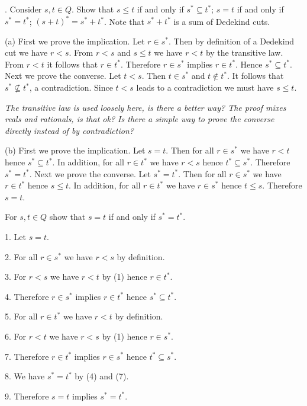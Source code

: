 \nopagenumbers

. Consider $s,t\in Q$. Show that
\medskip
{} $s\le t$ if and only if $s^*\subseteq t^*$;
 $s=t$ if and only if $s^*=t^*$;
 $(s+t)^*=s^*+t^*$. Note that $s^*+t^*$ is a sum of Dedekind
cuts.

\bigskip
\noindent
(a)
First we prove the implication.
Let $r\in s^*$. Then by definition of a Dedekind cut we have $r<s$.
From $r<s$ and $s\le t$ we have $r<t$ by the transitive law.
From $r<t$ it follows that $r\in t^*$.
Therefore $r\in s^*$ implies $r\in t^*$. Hence $s^*\subseteq t^*$.
Next we prove the converse.
Let $t<s$. Then $t\in s^*$ and $t\not\in t^*$.
It follows that $s^*\not\subseteq t^*$, a contradiction.
Since $t<s$ leads to a contradiction we must have $s\le t$.

\bigskip
\noindent
{\it The transitive law is used loosely here, is there a better way?
The proof mixes reals and rationals, is that ok?
Is there a simple way to prove the converse directly instead of by
contradiction?}

\bigskip
\noindent
(b)
First we prove the implication.
Let $s=t$.
Then for all $r\in s^*$ we have $r<t$ hence $s^*\subseteq t^*$.
In addition, for all $r\in t^*$ we have $r<s$ hence $t^*\subseteq s^*$.
Therefore $s^*=t^*$.
Next we prove the converse.
Let $s^*=t^*$.
Then for all $r\in s^*$ we have $r\in t^*$ hence $s\le t$.
In addition, for all $r\in t^*$ we have $r\in s^*$ hence $t\le s$.
Therefore $s=t$.

\vfill
\eject

\noindent
For $s,t\in Q$ show that $s=t$ if and only if $s^*=t^*$.


\bigskip
\item{1.} Let $s=t$.

\item{2.} For all $r\in s^*$ we have $r<s$ by definition.
\item{3.} For $r<s$ we have $r<t$ by (1) hence $r\in t^*$.
\item{4.} Therefore $r\in s^*$ implies $r\in t^*$ hence $s^*\subseteq t^*$.

\item{5.} For all $r\in t^*$ we have $r<t$ by definition.
\item{6.} For $r<t$ we have $r<s$ by (1) hence $r\in s^*$.
\item{7.} Therefore $r\in t^*$ implies $r\in s^*$ hence $t^*\subseteq s^*$.

\item{8.} We have $s^*=t^*$ by (4) and (7).
\item{9.} Therefore $s=t$ implies $s^*=t^*$.

